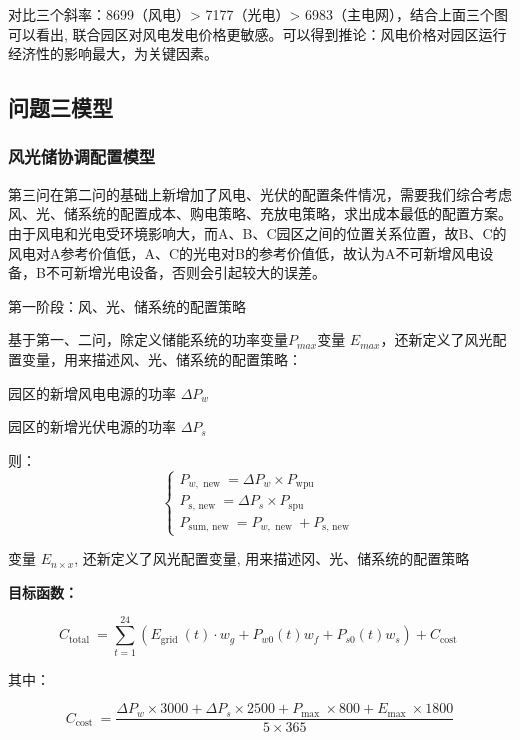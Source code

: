 \documentclass{cumcmthesis}
\begin{document}
对比三个斜率：8699（风电）> 7177（光电）> 6983（主电网），结合上面三个图可以看出, 联合园区对风电发电价格更敏感。可以得到推论：风电价格对园区运行经济性的影响最大，为关键因素。

  
\subsection{问题三模型}


  \subsubsection{风光储协调配置模型}\label{ll}
第三问在第二问的基础上新增加了风电、光伏的配置条件情况，需要我们综合考虑风、光、储系统的配置成本、购电策略、充放电策略，求出成本最低的配置方案。由于风电和光电受环境影响大，而A、B、C园区之间的位置关系位置，故B、C的风电对A参考价值低，A、C的光电对B的参考价值低，故认为A不可新增风电设备，B不可新增光电设备，否则会引起较大的误差。

第一阶段：风、光、储系统的配置策略

基于第一、二问，除定义储能系统的功率变量$P_{m a x}$变量 $E_{m a x}$，还新定义了风光配置变量，用来描述风、光、储系统的配置策略：

园区的新增风电电源的功率 $\Delta P_w$

园区的新增光伏电源的功率 $\Delta P_s$

则：
\begin{equation}
\left\{\begin{array}{l}
P_{w, \text { new }}=\Delta P_w \times P_{\text {wpu }} \\
P_{\text {s, new }}=\Delta P_s \times P_{\text {spu }} \\
P_{\text {sum, new }}=P_{w, \text { new }}+P_{\text {s, new }}
\end{array}\right.
\end{equation}

变量 $E_{n \times x}$, 还新定义了风光配置变量, 用来描述冈、光、储系统的配置策略
  
  
\textbf{目标函数：}
  
\begin{equation}
C_{\text {total }}=\sum_{t=1}^{24}\left(E_{\text {grid }}(t) \cdot w_g+P_{w 0}(t) w_f+P_{s 0}(t) w_s\right)+C_{\text {cost }}
\end{equation}

其中：

$$
C_{\text {cost }}=\frac{\Delta P_w \times 3000+\Delta P_s \times 2500+P_{\text {max }} \times 800+E_{\text {max }} \times 1800}{5 \times 365}
$$
\end{document}
